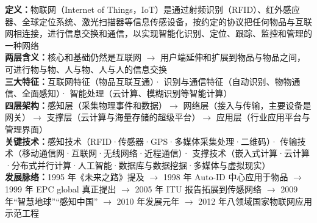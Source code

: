 \documentclass[a4paper,11pt]{article}
\begin{document}

\begin{knowmap}
\textbf{定义：}物联网（Internet of Things，IoT）是通过射频识别（RFID）、红外感应器、全球定位系统、激光扫描器等信息传感设备，按约定的协议把任何物品与互联网相连接，进行信息交换和通信，以实现智能化识别、定位、跟踪、监控和管理的一种网络\\[2pt]
\textbf{两层含义：}核心和基础仍然是互联网 $\rightarrow$ 用户端延伸和扩展到物品与物品之间，可进行物与物、人与物、人与人的信息交换\\[2pt]
\textbf{三大特征：}互联网特征（物品互联互通）· 识别与通信特征（自动识别、物物通信、全面感知）· 智能处理（云计算、模糊识别等智能计算）\\[2pt]
\textbf{四层架构：}感知层（采集物理事件和数据）$\rightarrow$ 网络层（接入与传输，主要设备是网关）$\rightarrow$ 支撑层（云计算与海量存储的超级平台）$\rightarrow$ 应用层（行业应用平台与管理界面）\\[2pt]
\textbf{关键技术：}感知技术（RFID·传感器·GPS·多媒体采集处理·二维码）· 传输技术（移动通信网·互联网·无线网络·近程通信）· 支撑技术（嵌入式计算·云计算·分布式并行计算·人工智能·数据库与数据挖掘·多媒体与虚拟现实）\\[2pt]
\textbf{发展脉络：}1995 年《未来之路》提及 $\rightarrow$ 1998 年 Auto-ID 中心应用于物品 $\rightarrow$ 1999 年 EPC global 真正提出 $\rightarrow$ 2005 年 ITU 报告拓展到传感网络 $\rightarrow$ 2009 年“智慧地球”“感知中国” $\rightarrow$ 2010 年发展元年 $\rightarrow$ 2012 年八领域国家物联网应用示范工程
\end{knowmap}
\end{document}
